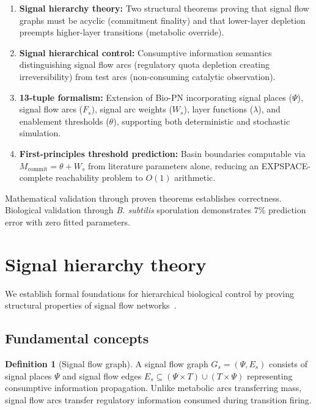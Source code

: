\documentclass[11pt,a4paper]{article}
\theoremstyle{plain}
\theoremstyle{definition}
\newtheorem{definition}{Definition}
\begin{document}
\begin{enumerate}
\item \textbf{Signal hierarchy theory:} Two structural theorems proving that signal flow graphs must be acyclic (commitment finality) and that lower-layer depletion preempts higher-layer transitions (metabolic override).

\item \textbf{Signal hierarchical control:} Consumptive information semantics distinguishing signal flow arcs (regulatory quota depletion creating irreversibility) from test arcs (non-consuming catalytic observation).

\item \textbf{13-tuple formalism:} Extension of Bio-PN incorporating signal places ($\Psi$), signal flow arcs ($F_s$), signal arc weights ($W_s$), layer functions ($\lambda$), and enablement thresholds ($\theta$), supporting both deterministic and stochastic simulation.

\item \textbf{First-principles threshold prediction:} Basin boundaries computable via $M_{\mathrm{commit}} = \theta + W_s$ from literature parameters alone, reducing an EXPSPACE-complete reachability problem to $O(1)$ arithmetic.
\end{enumerate}

Mathematical validation through proven theorems establishes correctness. Biological validation through \textit{B. subtilis} sporulation demonstrates 7\% prediction error with zero fitted parameters.

\section{Signal hierarchy theory}

We establish formal foundations for hierarchical biological control by proving structural properties of signal flow networks~\cite{petri1962,murata1989}.

\subsection{Fundamental concepts}

\begin{definition}[Signal flow graph]
A signal flow graph $G_s = (\Psi, E_s)$ consists of signal places $\Psi$ and signal flow edges $E_s \subseteq (\Psi \times T) \cup (T \times \Psi)$ representing consumptive information propagation. Unlike metabolic arcs transferring mass, signal flow arcs transfer regulatory information consumed during transition firing.
\end{definition}
\end{document}
